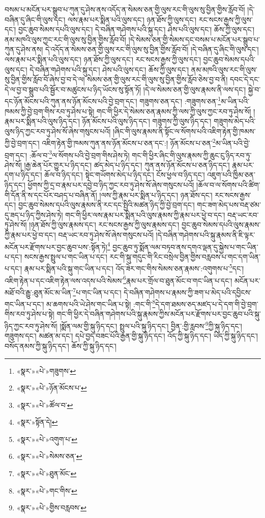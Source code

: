 བསམ་པ་མངོན་པར་སྒྲུབ་པ་ཀུན་དུ་ཤེས་ནས་འདོད་ན་སེམས་ཅན་གྱི་ལུས་རང་གི་ལུས་སུ་བྱིན་གྱིས་རློབ་བོ། །དེ་བཞིན་དུ་ཞིང་གི་ལུས་དང་། ལས་རྣམ་པར་སྨིན་པའི་ལུས་དང་། ཉན་ཐོས་ཀྱི་ལུས་དང་། རང་སངས་རྒྱས་ཀྱི་ལུས་དང་། བྱང་ཆུབ་སེམས་དཔའི་ལུས་དང་། དེ་བཞིན་གཤེགས་པའི་སྐུ་དང་། ཤེས་པའི་ལུས་དང་། ཆོས་ཀྱི་ལུས་དང་། ནམ་མཁའི་ལུས་ཀྱང་རང་གི་ལུས་སུ་བྱིན་གྱིས་རློབ་བོ། །དེ་སེམས་ཅན་གྱི་སེམས་དང་བསམ་པ་མངོན་པར་སྒྲུབ་པ་ཀུན་དུ་ཤེས་ནས། དེ་འདོད་ན་སེམས་ཅན་གྱི་ལུས་རང་གི་ལུས་སུ་བྱིན་གྱིས་རློབ་བོ། །དེ་བཞིན་དུ་ཞིང་གི་ལུས་དང་། ལས་རྣམ་པར་སྨིན་པའི་ལུས་དང་། ཉན་ཐོས་ཀྱི་ལུས་དང་། རང་སངས་རྒྱས་ཀྱི་ལུས་དང་། བྱང་ཆུབ་སེམས་དཔའི་ལུས་དང་། དེ་བཞིན་གཤེགས་པའི་སྐུ་དང་། ཤེས་པའི་ལུས་དང་། ཆོས་ཀྱི་ལུས་དང་། ནམ་མཁའི་ལུས་རང་གི་ལུས་སུ་བྱིན་གྱིས་རློབ་བོ་ཞེས་བྱ་བ་དེ་ལ། སེམས་ཅན་གྱི་ལུས་རང་གི་ལུས་སུ་བྱིན་གྱིས་རློབ་ཅེས་བྱ་བ་ནི། དབང་དེ་དང་དེ་ལ་བྱ་བ་སྒྲུབ་པའི་སྦྱོར་བ་མཚུངས་པ་ཉིད་ཡོངས་སུ་སྟོན་ཏོ། །དེ་ལ་སེམས་ཅན་གྱི་ལུས་རྣམས་ནི་ལས་དང་། སྐྱེ་བ་དང་ཉོན་མོངས་པའི་ཀུན་ནས་ཉོན་མོངས་པའི་བྱེ་བྲག་དང་། གཟུགས་ཅན་དང་། :གཟུགས་ཅན་\footnote{«སྣར་»«པེ་»གཟུགས་}མ་ཡིན་པའི་ཁམས་ཀྱི་བྱེ་བྲག་གིས་རབ་ཏུ་ཤེས་པ་སྟེ། གང་གི་ཕྱིར་དེ་སེམས་ཅན་རྣམས་ཀྱི་ལས་ཀྱི་ལུས་ཀྱང་རབ་ཏུ་ཤེས་སོ། །རྣམ་པར་སྨིན་པའི་ལུས་ཉིད་དང་། ཉོན་མོངས་པའི་ལུས་ཉིད་དང་། གཟུགས་ཀྱི་ལུས་ཉིད་དང་། གཟུགས་མེད་པའི་ལུས་ཉིད་ཀྱང་རབ་ཏུ་ཤེས་སོ་ཞེས་གསུངས་པའོ། །ཞིང་གི་ལུས་རྣམས་ནི་སྟོང་ལ་སོགས་པའི་འཇིག་རྟེན་གྱི་ཁམས་ཀྱི་བྱེ་བྲག་དང་། འཇིག་རྟེན་གྱི་ཁམས་ཀུན་ནས་ཉོན་མོངས་པ་ཅན་དང་:། ཉོན་མོངས་པ་ཅན་\footnote{«སྣར་»«པེ་»ཉོན་མོངས་པ་}མ་ཡིན་པའི་བྱེ་བྲག་དང་། :ཆོལ་བ་\footnote{«སྣར་»«པེ་»ཚོལ་བ་}ལ་སོགས་པའི་བྱེ་བྲག་གིས་ཤེས་ཏེ། གང་གི་ཕྱིར་ཞིང་གི་ལུས་རྣམས་ཀྱི་ཆུང་ངུ་ཉིད་རབ་ཏུ་ཤེས་སོ། །རྒྱ་ཆེན་པོར་གྱུར་པ་ཉིད་དང་། ཚད་མེད་པ་ཉིད་དང་། ཀུན་ནས་ཉོན་མོངས་པ་ཅན་ཉིད་དང་། རྣམ་པར་དག་པ་ཉིད་དང་། ཆོལ་བ་ཉིད་དང་། སྟེང་གཡོགས་མེད་པ་ཉིད་དང་། ངོས་ཕྱལ་བ་ཉིད་དང་། འཇུག་པའི་ཁྱིམ་ཅན་ཉིད་དང་། ཕྱོགས་ཀྱི་དྲ་བ་རྣམ་པར་དབྱེ་བ་ཉིད་ཀྱང་རབ་ཏུ་ཤེས་སོ་ཞེས་གསུངས་པའོ། །ཆོལ་བ་ལ་སོགས་པའི་ཚིག་གི་དོན་ནི་ས་དང་པོར་བཤད་པ་བཞིན་ནོ། །ལས་ཀྱི་རྣམ་པར་སྨིན་པ་ཉིད་དང་། ཉན་ཐོས་དང་། རང་སངས་རྒྱས་དང་། བྱང་ཆུབ་སེམས་དཔའི་ལུས་རྣམས་ནི་རང་དང་སྤྱིའི་མཚན་ཉིད་ཀྱི་བྱེ་བྲག་དང་། གང་ཟག་མེད་པས་བརྡ་ཙམ་དུ་ཟད་པ་ཉིད་ཀྱིས་ཤེས་ཏེ། གང་གི་ཕྱིར་ལས་རྣམ་པར་སྨིན་པའི་ལུས་རྣམས་ཀྱི་རྣམ་པར་ཕྱེ་བ་དང་། བརྡ་ཡང་རབ་ཏུ་ཤེས་སོ། །ཉན་ཐོས་ཀྱི་ལུས་རྣམས་དང་། རང་སངས་རྒྱས་ཀྱི་ལུས་རྣམས་དང་། བྱང་ཆུབ་སེམས་དཔའི་ལུས་རྣམས་ཀྱི་རྣམ་པར་ཕྱེ་བ་དང་། བརྡ་ཡང་རབ་ཏུ་ཤེས་སོ་ཞེས་གསུངས་པའོ། །དེ་བཞིན་གཤེགས་པའི་སྐུ་རྣམས་ནི་ཇི་ལྟར་མངོན་པར་རྫོགས་པར་བྱང་ཆུབ་པས་:སྟོན་ཏེ།\footnote{«སྣར་»སྟོན་དེ།} བྱང་ཆུབ་ཏུ་སྨོན་ལམ་བཏབ་ནས་དགའ་ལྡན་དུ་སྐྱེས་པ་གང་ཡིན་པ་དང་། སངས་རྒྱས་སྤྲུལ་པ་གང་ཡིན་པ་དང་། རང་གི་སྐུ་གདུང་གི་རིང་བསྲེལ་བྱིན་གྱིས་བརླབས་པ་གང་དག་ཡིན་པ་དང་། རྣམ་པར་སྨིན་པའི་སྐུ་གང་ཡིན་པ་དང་། འོད་ཟེར་གང་གིས་སེམས་ཅན་རྣམས་:འགུགས་པ་\footnote{«སྣར་»«པེ་»འགུག་པ་}དང་། འཇིག་རྟེན་པ་དང་འཇིག་རྟེན་ལས་འདས་པའི་སེམས་\footnote{«སྣར་»«པེ་»སེམས་ཅན་}རྣམ་པར་གྲོལ་བ་ཐུན་མོང་བ་གང་ཡིན་པ་དང་། མངོན་པར་མཐོ་བའི་རྒྱུ་:ཐུན་མོང་མ་ཡིན་\footnote{«སྣར་»«པེ་»ཐུན་མོང་}པ་གང་ཡིན་པ་དང་། དེ་བཞིན་གཤེགས་པ་རྣམས་ཀྱི་ཟག་པ་མེད་པའི་དབྱིངས་གང་ཡིན་པ་དང་། མ་ཆགས་པའི་ཡེ་ཤེས་གང་ཡིན་པ་སྟེ། :གང་གི་\footnote{«སྣར་»«པེ་»གང་གིས་}དེ་དག་ཐམས་ཅད་མཛད་པ་དེ་དག་གི་བྱེ་བྲག་གིས་རབ་ཏུ་ཤེས་པ་སྟེ། གང་གི་ཕྱིར་དེ་བཞིན་གཤེགས་པའི་སྐུ་རྣམས་ཀྱིས་མངོན་པར་རྫོགས་པར་བྱང་ཆུབ་པའི་སྐུ་ཉིད་ཀྱང་རབ་ཏུ་ཤེས་སོ། །སྨོན་ལམ་གྱི་སྐུ་ཉིད་དང་། སྤྲུལ་པའི་སྐུ་ཉིད་དང་། བྱིན་:གྱི་རླབས་\footnote{«སྣར་»«པེ་»གྱིས་བརླབས་}ཀྱི་སྐུ་ཉིད་དང་། གཟུགས་དང་། མཚན་མ་དང་། དཔེ་བྱད་བཟང་པོའི་རྒྱན་གྱི་སྐུ་ཉིད་དང་། འོད་ཀྱི་སྐུ་ཉིད་དང་། ཡིད་ཀྱི་སྐུ་ཉིད་དང་། བསོད་ནམས་ཀྱི་སྐུ་ཉིད་དང་། ཆོས་ཀྱི་སྐུ་ཉིད་དང་། 
